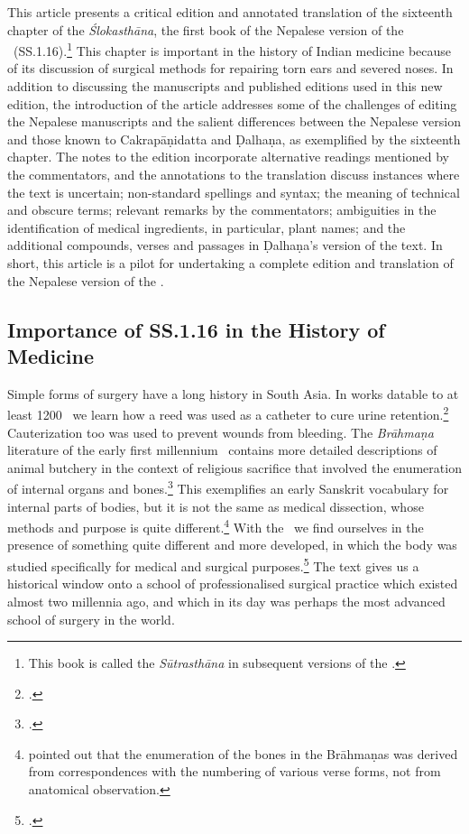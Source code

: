 This article presents a critical edition and annotated translation of the sixteenth chapter of the \emph{Ślokasthāna}, the first book of the Nepalese version of the \SS\ (SS.1.16).\footnote{This book is called the \emph{Sūtrasthāna} in subsequent versions of the \SS.} This chapter is important in the history of Indian medicine because of its discussion of surgical methods for repairing torn ears and severed noses. In addition to discussing the manuscripts and published editions used in this new edition, the introduction of the article addresses some of the challenges of editing the Nepalese manuscripts and the salient differences between the Nepalese version and those known to Cakrapāṇidatta and Ḍalhaṇa, as exemplified by the sixteenth chapter. The notes to the edition incorporate alternative readings mentioned by the commentators, and the annotations to the translation discuss instances where the text is uncertain; non-standard spellings and syntax; the meaning of technical and obscure terms; relevant remarks by the commentators; ambiguities in the identification of medical ingredients, in particular, plant names; and the additional compounds, verses and passages in Ḍalhaṇa's version of the text. In short, this article is a pilot for undertaking a complete edition and translation of the Nepalese version of the \SS.


\subsection{Importance of SS.1.16 in the History of Medicine}


Simple forms of surgery have a long history in South Asia. In works datable to at
least 1200 \BC\ we learn how a reed was used as a catheter to cure urine
retention.\footcite[70--71]{zysk-1985} Cauterization too was used to prevent
wounds from bleeding. The \emph{Brāhmaṇa} literature of the early first 
millennium
\BC\ contains more detailed descriptions of animal butchery in the context of
religious sacrifice that involved the enumeration of internal organs and
bones.\footcite{mala-1996}   This exemplifies an early Sanskrit vocabulary for
internal parts of bodies, but it is not the same as medical dissection, whose
methods and purpose is quite different.\footnote{\citet{keit-1908} pointed out
that the enumeration of the bones in the Brāhmaṇas was derived from
correspondences with the numbering of various verse forms, not from anatomical
observation.}  With the \SS\ we find ourselves 
in
the presence of something quite different and more developed, in which the body
was studied specifically for medical and surgical purposes.\footcite{zysk-1986} 
The text gives us a historical window onto a school of
professionalised surgical practice which existed almost two millennia ago, and
which in its day was perhaps the most advanced school of surgery in the world.


